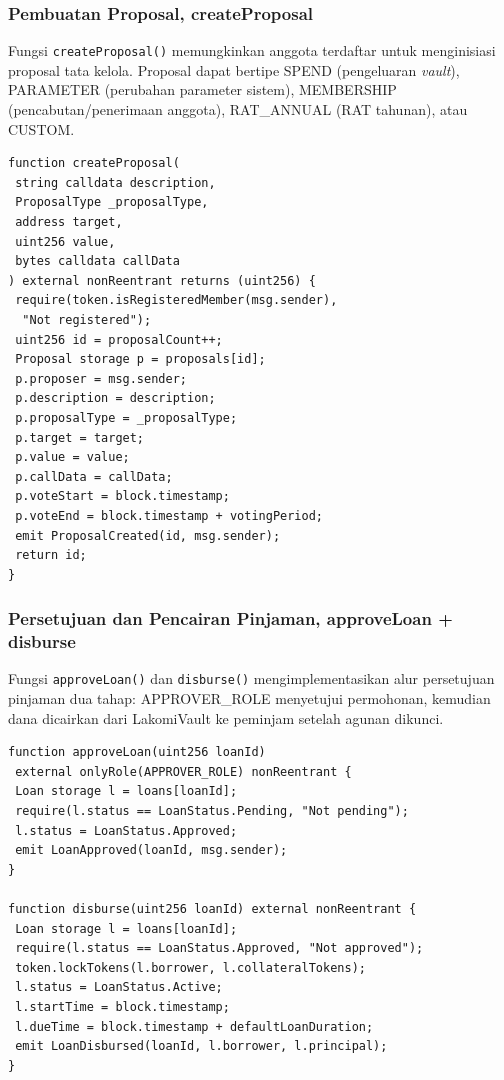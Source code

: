 \subsubsection{Pembuatan Proposal, createProposal}

Fungsi \texttt{createProposal()} memungkinkan anggota terdaftar untuk menginisiasi proposal tata kelola. Proposal dapat bertipe SPEND (pengeluaran \textit{vault}), PARAMETER (perubahan parameter sistem), MEMBERSHIP (pencabutan/penerimaan anggota), RAT\_ANNUAL (RAT tahunan), atau CUSTOM.

\begin{lstlisting}
function createProposal(
 string calldata description,
 ProposalType _proposalType,
 address target,
 uint256 value,
 bytes calldata callData
) external nonReentrant returns (uint256) {
 require(token.isRegisteredMember(msg.sender),
  "Not registered");
 uint256 id = proposalCount++;
 Proposal storage p = proposals[id];
 p.proposer = msg.sender;
 p.description = description;
 p.proposalType = _proposalType;
 p.target = target;
 p.value = value;
 p.callData = callData;
 p.voteStart = block.timestamp;
 p.voteEnd = block.timestamp + votingPeriod;
 emit ProposalCreated(id, msg.sender);
 return id;
}
\end{lstlisting}

\subsubsection{Persetujuan dan Pencairan Pinjaman, approveLoan + disburse}

Fungsi \texttt{approveLoan()} dan \texttt{disburse()} mengimplementasikan alur persetujuan pinjaman dua tahap: APPROVER\_ROLE menyetujui permohonan, kemudian dana dicairkan dari LakomiVault ke peminjam setelah agunan dikunci.

\begin{lstlisting}
function approveLoan(uint256 loanId) 
 external onlyRole(APPROVER_ROLE) nonReentrant {
 Loan storage l = loans[loanId];
 require(l.status == LoanStatus.Pending, "Not pending");
 l.status = LoanStatus.Approved;
 emit LoanApproved(loanId, msg.sender);
}

function disburse(uint256 loanId) external nonReentrant {
 Loan storage l = loans[loanId];
 require(l.status == LoanStatus.Approved, "Not approved");
 token.lockTokens(l.borrower, l.collateralTokens);
 l.status = LoanStatus.Active;
 l.startTime = block.timestamp;
 l.dueTime = block.timestamp + defaultLoanDuration;
 emit LoanDisbursed(loanId, l.borrower, l.principal);
}
\end{lstlisting}

